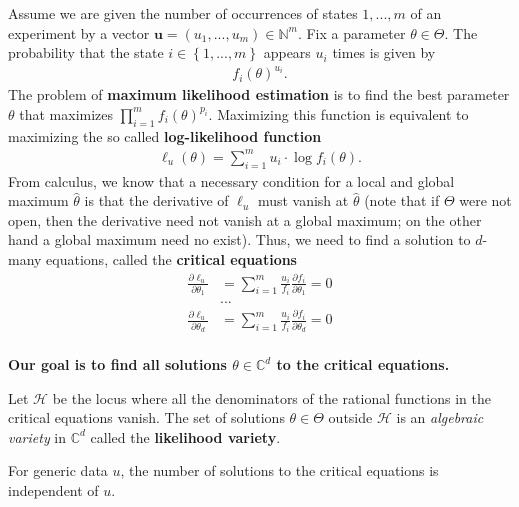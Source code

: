 \documentclass[a4paper, 11pt]{article}
\begin{document}
Assume we are given the number of occurrences of states \( 1,...,m \) of an experiment by a vector \( \mathbf u = (u_1,...,u_m) \in \mathbb N^m \). Fix a parameter \( \theta \in \Theta \). The probability that the state \( i \in \left\{ 1,...,m \right\} \) appears \( u_i \) times is given by
\begin{align*}
  f_i(\theta)^{u_i}.
\end{align*}
The problem of \textbf{maximum likelihood estimation} is to find the best parameter \( \theta \) that maximizes \(   \prod_{i=1}^m f_i(\theta)^{p_i}\). Maximizing this function is equivalent to maximizing the so called \textbf{log-likelihood function}
\begin{align*}
  \ell_u(\theta) = \sum^m_{i=1}u_i \cdot \log{f_i(\theta)}.
\end{align*}
From calculus, we know that a necessary condition for a local and global maximum \( \hat \theta \) is that the derivative of \( \ell_u \) must vanish at \( \hat \theta \) (note that if \( \Theta \) were not open, then the derivative need not vanish at a global maximum; on the other hand a global maximum need no exist). Thus, we need to find a solution to \( d \)-many equations, called the \textbf{critical equations}
\begin{align*}
  \frac{\partial \ell_u}{\partial \theta_1} &= \sum^m_{i=1} \frac{u_i}{f_i} \frac{\partial f_i}{\partial \theta_1} = 0 \\
  &... \\
  \frac{\partial \ell_u}{\partial \theta_d} &= \sum^m_{i=1} \frac{u_i}{f_i} \frac{\partial f_i}{\partial \theta_d} = 0 \\
\end{align*}

\begin{mdframed}
\begin{center}
  \textbf{{Our goal is to find all solutions \( \theta \in \mathbb C^d \) to the critical equations.}}
\end{center}
\end{mdframed}

Let \( \mathcal H \) be the locus where all the denominators of the rational functions in the critical equations vanish. The set of solutions \( \theta \in \Theta \) outside \( \mathcal H \) is an \emph{algebraic variety} in \( \mathbb C^d \) called the \textbf{likelihood variety}.

\begin{prop}
  For generic data \( u \), the number of solutions to the critical equations is independent of \( u \).
\end{prop}
\end{document}
